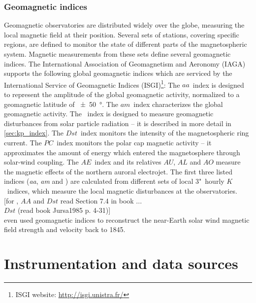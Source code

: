 \subsection{Geomagnetic indices}
\label{sec:geomagnetic_indices}
Geomagnetic observatories are distributed widely over the globe, measuring the local magnetic field at their position. Several sets of stations, covering specific regions, are defined to monitor the state of different parts of the magnetospheric system. Magnetic measurements from these sets define several geomagnetic indices. The International Association of Geomagnetism and Aeronomy (IAGA) supports the following global geomagnetic indices which are serviced by the International Service of Geomagnetic Indices (ISGI)\footnote{ISGI website: \url{http://isgi.unistra.fr/}}:
The $aa$~index is designed to represent the amplitude of the global geomagnetic activity, normalized to a geomagnetic latitude of \SI{+-50}{\degree}. The $am$~index characterizes the global geomagnetic activity. The \Kp{}~index is designed to measure geomagnetic disturbances from solar particle radiation -- it is described in more detail in \autoref{sec:kp_index}. The $Dst$~index monitors the intensity of the magnetospheric ring current. The $PC$~index monitors the polar cap magnetic activity -- it approximates the amount of energy which entered the magnetosphere through solar-wind coupling. The $AE$~index and its relatives $AU$, $AL$ and $AO$ measure the magnetic effects of the northern auroral electrojet.
The first three listed indices (\textit{aa}, \textit{am} and \Kp{}) are calculated from different sets of local 3"~hourly $K$~indices, which measure the local magnetic disturbances at the observatories.\\

[for \Kp{}, $AA$ and $Dst$ read Section 7.4 in book \citet{Bothmer2007}...\\
$Dst$ (read book Jursa1985 p. 4-31)]\\

\citet{Lockwood2014} even used geomagnetic indices to reconstruct the near-Earth solar wind magnetic field strength and velocity back to 1845.\\




\chapter{Instrumentation and data sources}
\label{chap:data}

